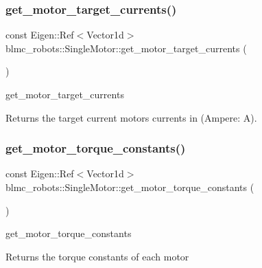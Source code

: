 \subsubsection{\texorpdfstring{get\+\_\+motor\+\_\+target\+\_\+currents()}{get\_motor\_target\_currents()}}
{\footnotesize\ttfamily const Eigen\+::\+Ref$<$Vector1d$>$ blmc\+\_\+robots\+::\+Single\+Motor\+::get\+\_\+motor\+\_\+target\+\_\+currents (\begin{DoxyParamCaption}{ }\end{DoxyParamCaption})\hspace{0.3cm}{\ttfamily [inline]}}



get\+\_\+motor\+\_\+target\+\_\+currents 

\begin{DoxyReturn}{Returns}
the target current motors currents in (Ampere\+: A). 
\end{DoxyReturn}
\mbox{\label{classblmc__robots_1_1SingleMotor_ac368bb72104b1a2e076142d4002740fb}} 
\subsubsection{\texorpdfstring{get\+\_\+motor\+\_\+torque\+\_\+constants()}{get\_motor\_torque\_constants()}}
{\footnotesize\ttfamily const Eigen\+::\+Ref$<$Vector1d$>$ blmc\+\_\+robots\+::\+Single\+Motor\+::get\+\_\+motor\+\_\+torque\+\_\+constants (\begin{DoxyParamCaption}{ }\end{DoxyParamCaption})\hspace{0.3cm}{\ttfamily [inline]}}



get\+\_\+motor\+\_\+torque\+\_\+constants 

\begin{DoxyReturn}{Returns}
the torque constants of each motor 
\end{DoxyReturn}
\mbox{\label{classblmc__robots_1_1SingleMotor_a375565046712276a1f3bd941078a44fb}} 
